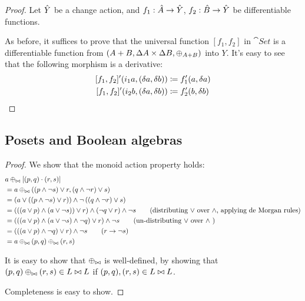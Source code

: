 \disjointUnions*
\begin{proof}
  \label{prf:disjointUnions}
  Let $\hat{Y}$ be a change action, and $f_1 : \hat{A} \rightarrow \hat{Y}$, $f_2 : \hat{B}
  \rightarrow \hat{Y}$ be differentiable functions.

  As before, it suffices to prove that the universal function $[f_1, f_2]$ in $\cat{Set}$ is a differentiable
  function from $(A + B,\Delta A \times \Delta B,\oplus_{A + B})$ into $Y$. It's easy to see
  that the following morphism is a derivative:
  \begin{align*}
    \derive{[f_1, f_2]} (i_1 a, (\change{a}, \change{b})) &\defeq f_1'(a, \change{a})\\
    \derive{[f_1, f_2]} (i_2 b, (\change{a}, \change{b})) &\defeq f_2'(b, \change{b})
  \end{align*}
\end{proof}

\subsection{Posets and Boolean algebras}

\lsuperpose*
\begin{proof}
  \label{prf:lsuperpose}
  We show that the monoid action property holds:
  \begin{align*}
    &a \oplus_{\bowtie} \left[(p, q) \cdot (r, s)\right]\\
    &= a \oplus_{\bowtie} ((p \wedge \neg s) \vee r, (q \wedge \neg r) \vee s)\\
    &= \left(
      a \vee
      \left(
        \left(
          p \wedge \neg s
        \right)
        \vee r
      \right)
    \right)
    \wedge \neg
    \left(
      \left(
        q \wedge \neg r
      \right)
      \vee s
    \right)\\
    &= \left(
      \left(
        \left(
          a \vee p
        \right)
        \wedge
        \left(
          a \vee \neg s
        \right)
      \right)
      \vee r
    \right)
    \wedge
    \left(
      \neg q \vee r
    \right)
    \wedge
    \neg s
    \tag{distributing $\vee$ over $\wedge$, applying de Morgan rules}\\
    &= \left(
      \left(
        \left(
          a \vee p
        \right)
        \wedge
        \left(
          a \vee \neg s
        \right)
        \wedge
        \neg q
      \right)
      \vee r
    \right)
    \wedge
    \neg s
    \tag{un-distributing $\vee$ over $\wedge$ }\\
    &= \left(
      \left(
        \left(
          a \vee p
        \right)
        \wedge
        \neg q
      \right)
      \vee r
    \right)
    \wedge
    \neg s
    \tag{$r \rightarrow \neg s$}\\
    &= a \oplus_{\bowtie} (p, q) \oplus_{\bowtie} (r, s)
  \end{align*}

  It is easy to show that $\oplus_{\bowtie}$ is well-defined, by showing that $(p,q)
  \oplus_{\bowtie} (r, s) \in L \bowtie L$ if $(p, q), (r,s) \in L \bowtie L$.

  Completeness is easy to show.
\end{proof}

